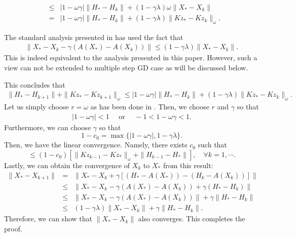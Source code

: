 \begin{itemize}
\begin{eqnarray*}
&\leq& |1 - \omega\gamma|\|H_* - H_k\| + (1 - \gamma \lambda) \omega \|X_* - X_k\| \\
&=& |1 - \omega\gamma|\|H_* - H_k\| + (1 - \gamma \lambda)  \|Kz_* - Kz_k\|_\omega. 
\end{eqnarray*}
\begin{remark}
The standard analysis presented in \cite{mishchenko2022proxskip} has used the fact that 
\begin{eqnarray*}
\|X_* - X_k - \gamma (A(X_*) - A(X_k)) \| \leq (1 - \gamma \lambda) \|X_* - X_k\|.
\end{eqnarray*}
This is indeed equivalent to the analysis presented in this paper. However, such a view can not be extended to multiple step GD case as will be discussed below. 
\end{remark}
This concludes that 
\begin{eqnarray*}
\|H_{*} - H_{k+1}\| + \|Kz_* - Kz_{k+1}\|_{\omega} \leq 
|1 - \omega\gamma|\|H_* - H_k\| + (1 - \gamma \lambda) \|Kz_* - Kz_k\|_\omega. 
\end{eqnarray*}
Let us simply choose $r = \omega$ as has been done in \cite{mishchenko2022proxskip}. Then, we choose $r$ and $\gamma$ so that 
\begin{eqnarray*}
|1 - \omega \gamma| < 1 \quad \mbox{ or } \quad -1 < 1 - \omega \gamma < 1.  
\end{eqnarray*}
Furthermore, we can choose $\gamma$ so that 
\begin{equation}
1 - c_0 = \max \{ |1 - \omega \gamma|, 1 - \gamma \lambda \}. 
\end{equation}
Then, we have the linear convergence. Namely, there exists $c_0$ such that 
\begin{equation}
[\|Kz_k - Kz_*\|_\omega + \|H_k - H_*\|] \leq (1 - c_0) [ \|Kz_{k-1} - Kz_*\|_\omega + \|H_{k-1} - H_*\| ], \quad \forall k = 1,\cdots. 
\end{equation}
Lastly, we can obtain the convergence of $X_k$ to $X_*$ from this result: 
\begin{eqnarray*}
\|X_{*} - X_{k+1}\| &=& \|X_* - X_k + \gamma [(H_* - A(X_*)) - (H_k - A(X_k))] \| \\
&\leq& \|X_* - X_k - \gamma (A(X_*) - A(X_k)) + \gamma (H_* - H_k) \| \\ 
&\leq& \|X_* - X_k - \gamma (A(X_*) - A(X_k))\| + \gamma \|H_* - H_k\| \\
&\leq& (1 - \gamma \lambda) \|X_* - X_k\| + \gamma \|H_* - H_k\|.
\end{eqnarray*}
Therefore, we can show that $\|X_* - X_{k}\|$ also converges.  This completes the proof. 


\end{itemize}
